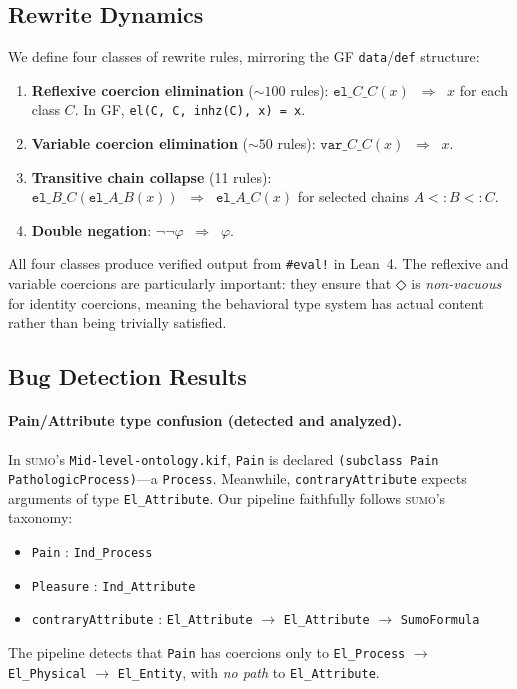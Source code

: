 \documentclass[11pt]{article}
\newcommand{\DiamondOp}{\mathbin{\Diamond}}
\newcommand{\Red}{\;\Rightarrow\;}
\newcommand{\SUMO}{\textsc{sumo}}
\theoremstyle{definition}
\theoremstyle{plain}
\begin{document}
\subsection{Rewrite Dynamics}

We define four classes of rewrite rules, mirroring the GF \texttt{data}/\texttt{def} structure:

\begin{enumerate}
  \item \textbf{Reflexive coercion elimination} (${\sim}100$ rules):
    $\texttt{el\_}C\texttt{\_}C(x) \;\Red\; x$ for each class $C$.
    In GF, \texttt{el(C, C, inhz(C), x) = x}.

  \item \textbf{Variable coercion elimination} (${\sim}50$ rules):
    $\texttt{var\_}C\texttt{\_}C(x) \;\Red\; x$.

  \item \textbf{Transitive chain collapse} (11 rules):
    $\texttt{el\_}B\texttt{\_}C(\texttt{el\_}A\texttt{\_}B(x))
      \;\Red\; \texttt{el\_}A\texttt{\_}C(x)$
    for selected chains $A <: B <: C$.

  \item \textbf{Double negation}: $\lnot\lnot\varphi \;\Red\; \varphi$.
\end{enumerate}

All four classes produce verified output from \texttt{\#eval!} in
Lean~4.  The reflexive and variable coercions are particularly
important: they ensure that $\DiamondOp$ is \emph{non-vacuous} for
identity coercions, meaning the behavioral type system has actual
content rather than being trivially satisfied.

\subsection{Bug Detection Results}

\paragraph{Pain/Attribute type confusion (detected and analyzed).}
In \SUMO{}'s \texttt{Mid-level-ontology.kif}, \texttt{Pain} is
declared \texttt{(subclass Pain PathologicProcess)}---a
\texttt{Process}.  Meanwhile, \texttt{contraryAttribute} expects
arguments of type \texttt{El\_Attribute}.  Our pipeline faithfully
follows \SUMO{}'s taxonomy:
\begin{itemize}[nosep]
  \item \texttt{Pain} : \texttt{Ind\_Process}
  \item \texttt{Pleasure} : \texttt{Ind\_Attribute}
  \item \texttt{contraryAttribute} : \texttt{El\_Attribute} $\to$
    \texttt{El\_Attribute} $\to$ \texttt{SumoFormula}
\end{itemize}
The pipeline detects that \texttt{Pain} has coercions only to
\texttt{El\_Process} $\to$ \texttt{El\_Physical} $\to$
\texttt{El\_Entity}, with \emph{no path} to \texttt{El\_Attribute}.
\end{document}
